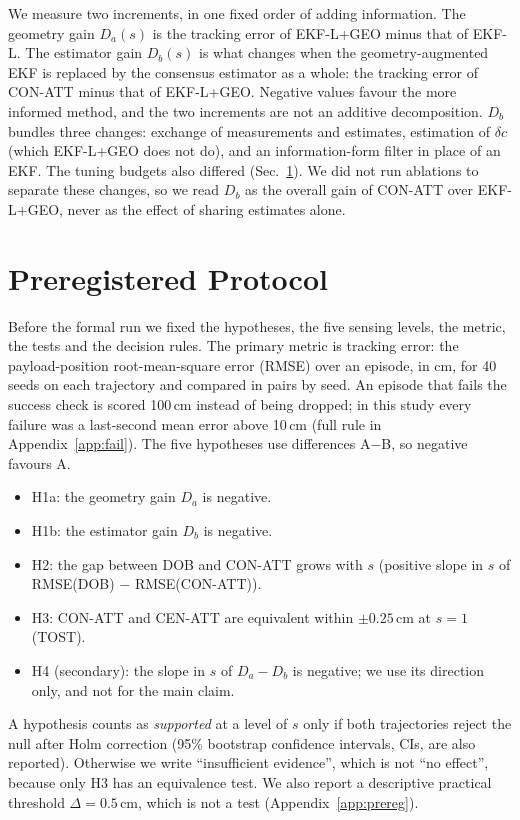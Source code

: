 \documentclass[conference]{IEEEtran}
\begin{document}
We measure two increments, in one fixed order of adding information. The geometry gain $D_a(s)$ is the tracking error of EKF-L+GEO minus that of EKF-L. The estimator gain $D_b(s)$ is what changes when the geometry-augmented EKF is replaced by the consensus estimator as a whole: the tracking error of CON-ATT minus that of EKF-L+GEO. Negative values favour the more informed method, and the two increments are not an additive decomposition. $D_b$ bundles three changes: exchange of measurements and estimates, estimation of $\delta c$ (which EKF-L+GEO does not do), and an information-form filter in place of an EKF. The tuning budgets also differed (Sec.~\ref{sec:protocol}). We did not run ablations to separate these changes, so we read $D_b$ as the overall gain of CON-ATT over EKF-L+GEO, never as the effect of sharing estimates alone.

\section{Preregistered Protocol}\label{sec:protocol}
Before the formal run we fixed the hypotheses, the five sensing levels, the metric, the tests and the decision rules. The primary metric is tracking error: the payload-position root-mean-square error (RMSE) over an episode, in cm, for 40 seeds on each trajectory and compared in pairs by seed. An episode that fails the success check is scored 100\,cm instead of being dropped; in this study every failure was a last-second mean error above 10\,cm (full rule in Appendix~\ref{app:fail}). The five hypotheses use differences A$-$B, so negative favours A.
\begin{itemize}
\item H1a: the geometry gain $D_a$ is negative.
\item H1b: the estimator gain $D_b$ is negative.
\item H2: the gap between DOB and CON-ATT grows with $s$ (positive slope in $s$ of RMSE(DOB) $-$ RMSE(CON-ATT)).
\item H3: CON-ATT and CEN-ATT are equivalent within $\pm0.25$\,cm at $s{=}1$ (TOST).
\item H4 (secondary): the slope in $s$ of $D_a-D_b$ is negative; we use its direction only, and not for the main claim.
\end{itemize}
A hypothesis counts as \emph{supported} at a level of $s$ only if both trajectories reject the null after Holm correction (95\% bootstrap confidence intervals, CIs, are also reported). Otherwise we write ``insufficient evidence'', which is not ``no effect'', because only H3 has an equivalence test. We also report a descriptive practical threshold $\Delta=0.5$\,cm, which is not a test (Appendix~\ref{app:prereg}).
\end{document}

